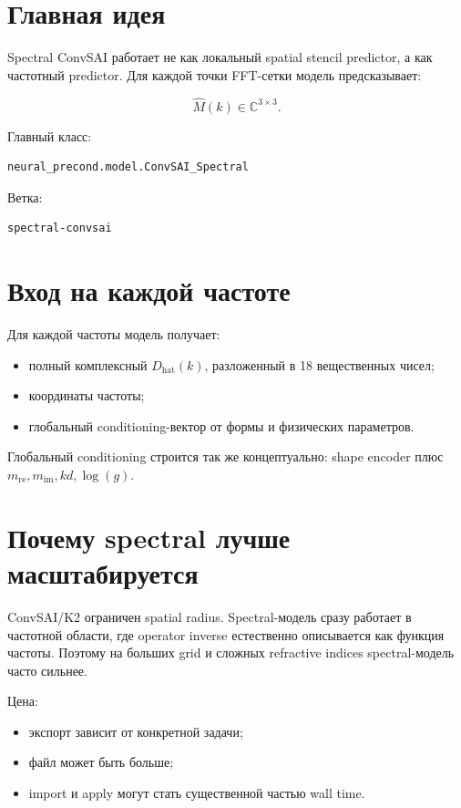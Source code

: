 \documentclass[11pt,a4paper,oneside]{book}
\newcommand{\C}{\mathbb{C}}
\begin{document}
\section{Главная идея}

Spectral ConvSAI работает не как локальный spatial stencil predictor, а как
частотный predictor. Для каждой точки FFT-сетки модель предсказывает:

\begin{equation}
  \widehat{M}(k) \in \C^{3\times3}.
\end{equation}

Главный класс:

\begin{lstlisting}
neural_precond.model.ConvSAI_Spectral
\end{lstlisting}

Ветка:

\begin{lstlisting}
spectral-convsai
\end{lstlisting}

\section{Вход на каждой частоте}

Для каждой частоты модель получает:

\begin{itemize}[leftmargin=2em]
  \item полный комплексный $D_{\mathrm{hat}}(k)$, разложенный в 18 вещественных чисел;
  \item координаты частоты;
  \item глобальный conditioning-вектор от формы и физических параметров.
\end{itemize}

Глобальный conditioning строится так же концептуально: shape encoder плюс
$m_{\mathrm{re}}, m_{\mathrm{im}}, kd, \log(g)$.

\section{Почему spectral лучше масштабируется}

ConvSAI/K2 ограничен spatial radius. Spectral-модель сразу работает в
частотной области, где operator inverse естественно описывается как функция
частоты. Поэтому на больших grid и сложных refractive indices spectral-модель
часто сильнее.

Цена:

\begin{itemize}[leftmargin=2em]
  \item экспорт зависит от конкретной задачи;
  \item файл может быть больше;
  \item import и apply могут стать существенной частью wall time.
\end{itemize}
\end{document}
